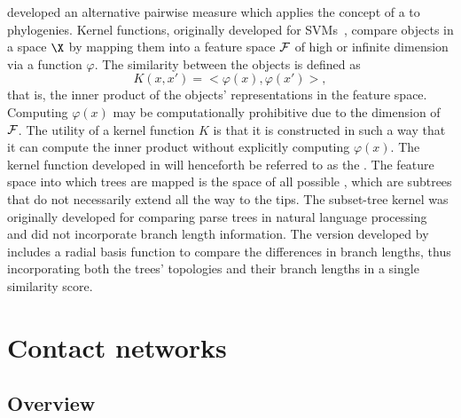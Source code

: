 \textcite{poon2013mapping} developed an alternative pairwise measure which
applies the concept of a  to phylogenies. Kernel
functions, originally developed for \glspl{SVM}~\autocite{burges1998tutorial}, 
compare objects in a space $\X$ by mapping them into a feature space $\mathcal{F}$ of
high or infinite dimension via a function $\varphi$. The similarity between the
objects is defined as
\[  
  K(x, x') = <\varphi(x), \varphi(x')>,
\]
that is, the inner product of the objects' representations in the feature
space. Computing $\varphi(x)$ may be computationally prohibitive due to the
dimension of $\mathcal{F}$. The utility of a kernel function $K$ is that it is
constructed in such a way that it can compute the inner product without
explicitly computing $\varphi(x)$. The kernel function developed in
\autocite{poon2013mapping} will henceforth be referred to as the . The feature space into which trees are mapped is the space of all
possible , which are subtrees that do not necessarily extend
all the way to the tips. The subset-tree kernel was originally developed for
comparing parse trees in natural language processing~\autocite{collins2002new}
and did not incorporate branch length information. The version developed by
\textcite{poon2013mapping} includes a radial basis function to compare the
differences in branch lengths, thus incorporating both the trees' topologies
and their branch lengths in a single similarity score. 


\section{Contact networks}
\label{sec:contactnet}

\subsection{Overview}
\label{subsec:netoverview}

